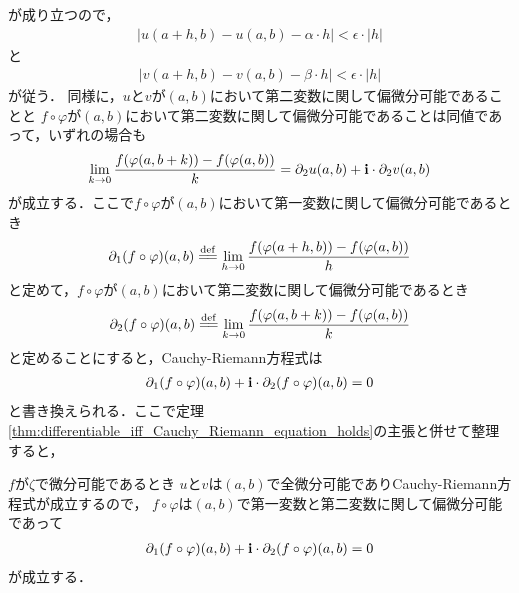 	が成り立つので，
	\begin{align}
		\left| u(a+h,b) - u(a,b) - \alpha \cdot h\right| < \epsilon \cdot |h|
	\end{align}
	と
	\begin{align}
		\left| v(a+h,b) - v(a,b) - \beta \cdot h\right| < \epsilon \cdot |h|
	\end{align}
	が従う．
	同様に，$u$と$v$が$(a,b)$において第二変数に関して偏微分可能であることと
	$f \circ \varphi$が$(a,b)$において第二変数に関して偏微分可能であることは同値であって，いずれの場合も
	\begin{align}
		\lim_{k \to 0} \frac{f(\varphi(a,b+k)) - f(\varphi(a,b))}{k} = \partial_2 u(a,b) + \mathbf{i} \cdot \partial_2 v(a,b)
	\end{align}
	が成立する．ここで$f \circ \varphi$が$(a,b)$において第一変数に関して偏微分可能であるとき
	\begin{align}
		\partial_1 (f \circ \varphi) (a,b) \defeq \lim_{h \to 0} \frac{f(\varphi(a+h,b)) - f(\varphi(a,b))}{h}
	\end{align}
	と定めて，$f \circ \varphi$が$(a,b)$において第二変数に関して偏微分可能であるとき
	\begin{align}
		\partial_2 (f \circ \varphi) (a,b) \defeq \lim_{k \to 0} \frac{f(\varphi(a,b+k)) - f(\varphi(a,b))}{k}
	\end{align}
	と定めることにすると，Cauchy-Riemann方程式は
	\begin{align}
		\partial_1 (f \circ \varphi) (a,b) + \mathbf{i} \cdot \partial_2 (f \circ \varphi)(a,b) = 0
	\end{align}
	と書き換えられる．ここで定理\ref{thm:differentiable_iff_Cauchy_Riemann_equation_holds}の主張と併せて整理すると，
	
	\begin{itembox}[l]{$f$が$\zeta$で微分可能であるとき}
		$u$と$v$は$(a,b)$で全微分可能でありCauchy-Riemann方程式が成立するので，
		$f \circ \varphi$は$(a,b)$で第一変数と第二変数に関して偏微分可能であって
		\begin{align}
			\partial_1 (f \circ \varphi) (a,b) + \mathbf{i} \cdot \partial_2 (f \circ \varphi)(a,b) = 0
		\end{align}
		が成立する．
	\end{itembox}
	
